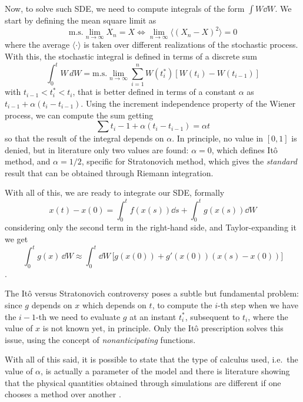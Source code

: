\documentclass[../../master_thesis_np.tex]{subfiles}
\begin{document}
		Now, to solve such SDE, we need to compute integrals of the form $\int W \dd{W}$. 
		We start by defining the mean square limit as
		\begin{equation} 
			\text{m.s.} \lim_{n \to \infty} X_n = X \iff \lim_{n \to \infty} \langle(X_n - X)^2\rangle = 0 
		\end{equation}
		where the average $\langle \cdot \rangle$ is taken over different realizations of the stochastic process. 
		With this, the stochastic integral is defined in terms of a discrete sum
		\begin{equation} 
			\int_0^t W \, dW = \text{m.s.} \lim_{n \to \infty} \sum_{i=1}^n W(t_i^*) \left[ W(t_i) - W(t_{i-1}) \right] 
		\end{equation}
		with $t_{i-1} < t_i^* < t_i$, that is better defined in terms of a constant $\alpha$ as $t_{i-1}+\alpha (t_i - t_{i-1})$. 
		Using the increment independence property of the Wiener process, we can compute the sum getting 
		\begin{equation} 
			\sum t_i-1 + \alpha(t_i - t_{i-1}) = \alpha t 
		\end{equation}
		so that the result of the integral depends on $\alpha$. 
		In principle, no value in $[0,1]$ is denied, but in literature only two values are found: $\alpha = 0$, which defines Itô method, and $\alpha = 1/2$, specific for Stratonovich method, which gives the \emph{standard} result that can be obtained through Riemann integration. 
		
		With all of this, we are ready to integrate our SDE, formally
		\begin{equation} 
			x(t) - x(0) = \int_{0}^{t} f(x(s)) \dd{s} + \int_{0}^{t} g(x(s)) \dd{W}
		\end{equation} 
		considering only the second term in the right-hand side, and Taylor-expanding it we get
		\begin{equation} 
			\int_0^t g(x) \, \dd{W} \approx \int_0^t \dd{W} \, \big[g(x(0)) + g'(x(0))(x(s) - x(0))\big]
		 \end{equation}.
		 
		The Itô versus Stratonovich controversy poses a subtle but fundamental problem: since $g$ depends on $x$ which depends on $t$, to compute the $i$-th step when we have the $i-1$-th we need to evaluate $g$ at an instant $t_i^*$, subsequent to $t_i$, where the value of $x$ is not known yet, in principle. 
		Only the Itô prescription solves this issue, using the concept of \emph{nonanticipating} functions.
		 
		With all of this said, it is possible to state that the type of calculus used, i.e.~the value of $\alpha$, is actually a parameter of the model and there is literature showing that the physical quantities obtained through simulations are different if one chooses a method over another \cite{mannella_ito_2012}.	
		
\end{document}
